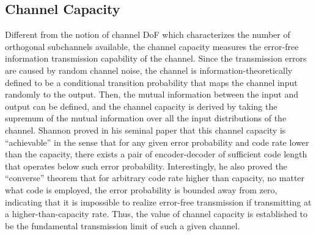 \documentclass[journal,twocolumn]{IEEEtran}
\begin{document}
\subsection{Channel Capacity}
\label{Sec_2_Subsec_2}
Different from the notion of channel DoF which characterizes the number of orthogonal subchannels available, the channel capacity measures the error-free information transmission capability of the channel. 
Since the transmission errors are caused by random channel noise, the channel is information-theoretically defined to be a conditional transition probability that maps the channel input randomly to the output. 
Then, the mutual information between the input and output can be defined, and the channel capacity is derived by taking the supremum of the mutual information over all the input distributions of the channel. Shannon proved in his seminal paper \cite{shannon1948mathematical} that this channel capacity is ``achievable'' in the sense that for any given error probability and code rate lower than the capacity, there exists a pair of encoder-decoder of sufficient code length that operates below such error probability. 
Interestingly, he also proved the ``converse'' theorem that for arbitrary code rate higher than capacity, no matter what code is employed, the error probability is bounded away from zero, indicating that it is impossible to realize error-free transmission if transmitting at a higher-than-capacity rate. Thus, the value of channel capacity is established to be the fundamental transmission limit of such a given channel. 


\end{document}
